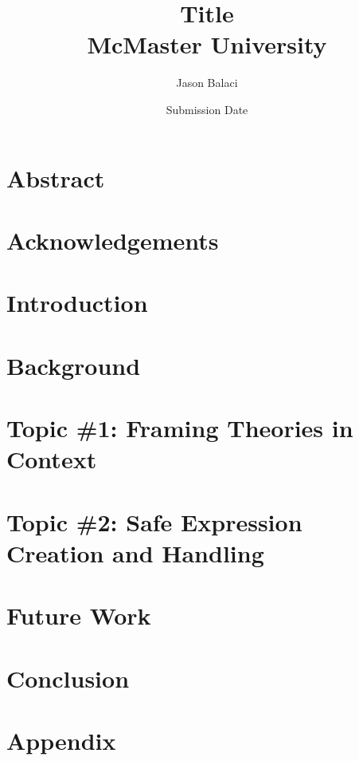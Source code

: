 \documentclass[12pt]{report}
\title{
    {Title}\\
    {McMaster University}
}
\author{Jason Balaci}
\date{Submission Date}
\begin{document}
    \todototoc
    \listoftodos

    \maketitle

    \chapter*{Abstract}
    

    \chapter*{Acknowledgements}
    

    \tableofcontents

    \chapter{Introduction}
    

    \chapter{Background}
    
    
    \chapter{Topic \#1: Framing Theories in Context}
    

    \chapter{Topic \#2: Safe Expression Creation and Handling}
    


    \chapter{Future Work}
    
    
    \chapter{Conclusion}
    

    \appendix
    \chapter{Appendix}
    

\end{document}
